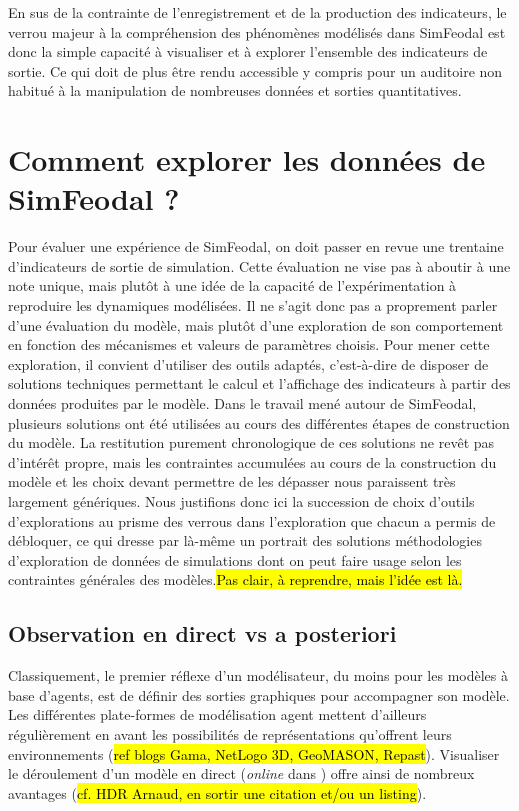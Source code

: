 	En sus de la contrainte de l'enregistrement et de la production des indicateurs, le verrou majeur à la compréhension des phénomènes modélisés dans SimFeodal est donc la simple capacité à visualiser et à explorer l'ensemble des indicateurs de sortie.
	Ce qui doit de plus être rendu accessible y compris pour un auditoire non habitué à la manipulation de nombreuses données et sorties quantitatives.

\clearpage
\section[Explorer les sorties]{Comment explorer les données de SimFeodal ?}\label{sec:explorer-sorties-simfeodal}

	Pour évaluer une expérience de SimFeodal, on doit passer en revue une trentaine d'indicateurs de sortie de simulation.
	Cette évaluation ne vise pas à aboutir à une note unique, mais plutôt à une idée de la capacité de l'expérimentation à reproduire les dynamiques modélisées.
	Il ne s'agit donc pas a proprement parler d'une évaluation du modèle, mais plutôt d'une exploration de son comportement en fonction des mécanismes et valeurs de paramètres choisis.
	Pour mener cette exploration, il convient d'utiliser des outils adaptés, c'est-à-dire de disposer de solutions techniques permettant le calcul et l'affichage des indicateurs à partir des données produites par le modèle.
	Dans le travail mené autour de SimFeodal, plusieurs solutions ont été utilisées au cours des différentes étapes de construction du modèle.
	La restitution purement chronologique de ces solutions ne revêt pas d'intérêt propre, mais les contraintes accumulées au cours de la construction du modèle et les choix devant permettre de les dépasser nous paraissent très largement génériques.
	Nous justifions donc ici la succession de choix d'outils d'explorations au prisme des verrous dans l'exploration que chacun a permis de débloquer, ce qui dresse par là-même un portrait des solutions méthodologies d'exploration de données de simulations dont on peut faire usage selon les contraintes générales des modèles.\hl{Pas clair, à reprendre, mais l'idée est là.}

	\subsection{Observation en direct vs a posteriori}\label{subsec:observation-a-posteriori}

	Classiquement, le premier réflexe d'un modélisateur, du moins pour les modèles à base d'agents, est de définir des sorties graphiques pour accompagner son modèle.
	Les différentes plate-formes de modélisation agent mettent d'ailleurs régulièrement en avant les possibilités de représentations qu'offrent leurs environnements (\hl{ref blogs Gama, NetLogo 3D, GeoMASON, Repast}).
	Visualiser le déroulement d'un modèle \og en direct\fg{} (\textit{online} dans \cite{grignard_agent-based_2017}) offre ainsi de nombreux avantages (\hl{cf. HDR Arnaud, en sortir une citation et/ou un listing}).

